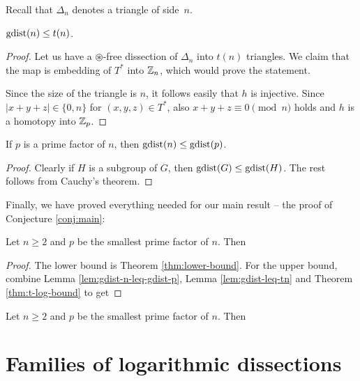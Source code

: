 Recall that $\Delta_n$ denotes a triangle of side~$n$.

\begin{lem}
\label{lem:gdist-leq-tn}
$\mathop{\mathrm{gdist}}(n) \leq t(n)$.
\end{lem}
\begin{proof}
Let us have a $\circledast$-free dissection of $\Delta_n$ into $t(n)$ triangles. We claim that the map
%
is embedding of $T^*$ into $\mathbb Z_n$, which would prove the statement.

Since the size of the triangle is $n$, it follows easily that $h$ is injective. Since $|x+y+z| \in \{0,n\}$ for $(x,y,z)\in T^*$, also $x+y+z \equiv 0 \pmod n$ holds and $h$ is a homotopy into $\mathbb Z_p$.
\end{proof}

\begin{lem}
\label{lem:gdist-n-leq-gdist-p}
If $p$ is a prime factor of $n$, then $\mathop{\mathrm{gdist}}(n) \leq \mathop{\mathrm{gdist}}(p)$.
\end{lem}%
\begin{proof}
Clearly if $H$ is a subgroup of $G$, then $\mathop{\mathrm{gdist}}(G) \leq \mathop{\mathrm{gdist}}(H)$. The rest follows from Cauchy's theorem.
\end{proof}

Finally, we have proved everything needed for our main result -- the proof of Conjecture \ref{conj:main}:

\begin{thm}
\label{cor:conj-proof}
Let $n \geq 2$ and $p$ be the smallest prime factor of $n$. Then
\end{thm}%
\begin{proof}
The lower bound is Theorem \ref{thm:lower-bound}. For the upper bound, combine Lemma \ref{lem:gdist-n-leq-gdist-p}, Lemma \ref{lem:gdist-leq-tn} and Theorem \ref{thm:t-log-bound} to get
\end{proof}

\begin{cor}
\label{cor:constants}
Let $n \geq 2$ and $p$ be the smallest prime factor of $n$. Then
\end{cor}%

\section{Families of logarithmic dissections}
\label{sec:other-log-dissections}


